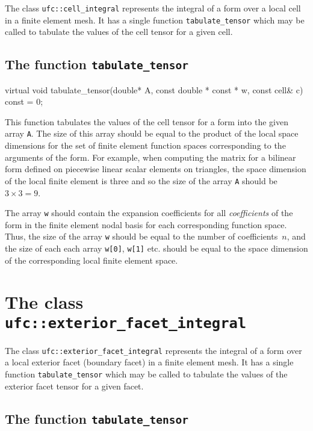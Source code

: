 The class \texttt{ufc::cell\_integral} represents the integral of a
form over a local cell in a finite element mesh. It has a single
function \texttt{tabulate\_tensor} which may be called to tabulate the
values of the cell tensor for a given cell.

\subsection{The function \texttt{tabulate\_tensor}}

\begin{code}
virtual void tabulate_tensor(double* A,
                             const double * const * w,
                             const cell& c) const = 0;
\end{code}

This function tabulates the values of the cell tensor for a form into
the given array \texttt{A}. The size of this array should be equal to
the product of the local space dimensions for the set of finite
element function spaces corresponding to the arguments of the
form. For example, when computing the matrix for a bilinear form
defined on piecewise linear scalar elements on triangles, the space dimension
of the local finite element is three and so the size of the array
\texttt{A} should be $3 \times 3 = 9$.

The array \texttt{w} should contain the expansion coefficients for all
\emph{coefficients} of the form in the finite element nodal basis for
each corresponding function space. Thus, the size of the array
\texttt{w} should be equal to the number of coefficients~$n$, and the
size of each each array \texttt{w[0]}, \texttt{w[1]} etc. should be
equal to the space dimension of the corresponding local finite element
space.

\section{The class \texttt{ufc::exterior\_facet\_integral}}

The class \texttt{ufc::exterior\_facet\_integral} represents the
integral of a form over a local exterior facet (boundary facet) in a
finite element mesh. It has a single function
\texttt{tabulate\_tensor} which may be called to tabulate the values
of the exterior facet tensor for a given facet.

\subsection{The function \texttt{tabulate\_tensor}}

